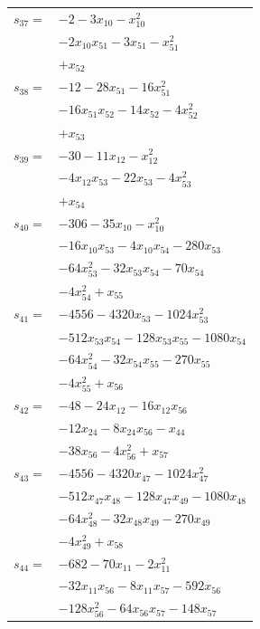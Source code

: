 \begin{longtable}{@{}r@{\;}l@{}}
\(s_{37}=\) & \(\displaystyle -2 -3x_{10} -x_{10}^{2}\) \\
 & \(\displaystyle -2x_{10}x_{51} -3x_{51} -x_{51}^{2}\) \\
 & \(\displaystyle +x_{52}\) \\[3pt]
\(s_{38}=\) & \(\displaystyle -12 -28x_{51} -16x_{51}^{2}\) \\
 & \(\displaystyle -16x_{51}x_{52} -14x_{52} -4x_{52}^{2}\) \\
 & \(\displaystyle +x_{53}\) \\[3pt]
\(s_{39}=\) & \(\displaystyle -30 -11x_{12} -x_{12}^{2}\) \\
 & \(\displaystyle -4x_{12}x_{53} -22x_{53} -4x_{53}^{2}\) \\
 & \(\displaystyle +x_{54}\) \\[3pt]
\(s_{40}=\) & \(\displaystyle -306 -35x_{10} -x_{10}^{2}\) \\
 & \(\displaystyle -16x_{10}x_{53} -4x_{10}x_{54} -280x_{53}\) \\
 & \(\displaystyle -64x_{53}^{2} -32x_{53}x_{54} -70x_{54}\) \\
 & \(\displaystyle -4x_{54}^{2} +x_{55}\) \\[3pt]
\(s_{41}=\) & \(\displaystyle -4556 -4320x_{53} -1024x_{53}^{2}\) \\
 & \(\displaystyle -512x_{53}x_{54} -128x_{53}x_{55} -1080x_{54}\) \\
 & \(\displaystyle -64x_{54}^{2} -32x_{54}x_{55} -270x_{55}\) \\
 & \(\displaystyle -4x_{55}^{2} +x_{56}\) \\[3pt]
\(s_{42}=\) & \(\displaystyle -48 -24x_{12} -16x_{12}x_{56}\) \\
 & \(\displaystyle -12x_{24} -8x_{24}x_{56} -x_{44}\) \\
 & \(\displaystyle -38x_{56} -4x_{56}^{2} +x_{57}\) \\[3pt]
\(s_{43}=\) & \(\displaystyle -4556 -4320x_{47} -1024x_{47}^{2}\) \\
 & \(\displaystyle -512x_{47}x_{48} -128x_{47}x_{49} -1080x_{48}\) \\
 & \(\displaystyle -64x_{48}^{2} -32x_{48}x_{49} -270x_{49}\) \\
 & \(\displaystyle -4x_{49}^{2} +x_{58}\) \\[3pt]
\(s_{44}=\) & \(\displaystyle -682 -70x_{11} -2x_{11}^{2}\) \\
 & \(\displaystyle -32x_{11}x_{56} -8x_{11}x_{57} -592x_{56}\) \\
 & \(\displaystyle -128x_{56}^{2} -64x_{56}x_{57} -148x_{57}\) \\

\end{longtable}
